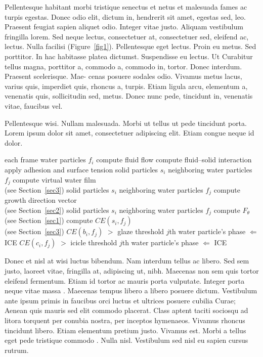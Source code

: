 \documentclass[ASNA,twocolumn]{USG} %
\begin{document}
Pellentesque habitant morbi tristique senectus et netus et malesuada fames ac turpis egestas. Donec odio elit,
dictum in, hendrerit sit amet, egestas sed, leo. Praesent feugiat sapien aliquet odio. Integer vitae justo. Aliquam
vestibulum fringilla lorem. Sed neque lectus, consectetuer at, consectetuer sed, eleifend ac, lectus. Nulla facilisi (Figure~\ref{fig1}).
Pellentesque eget lectus. Proin eu metus. Sed porttitor. In hac habitasse platea dictumst. Suspendisse eu lectus. Ut Curabitur tellus magna, porttitor a, commodo a, commodo in, tortor. Donec interdum. Praesent scelerisque. Mae-
cenas posuere sodales odio. Vivamus metus lacus, varius quis, imperdiet quis, rhoncus a, turpis. Etiam ligula arcu,
elementum a, venenatis quis, sollicitudin sed, metus. Donec nunc pede, tincidunt in, venenatis vitae, faucibus vel.



Pellentesque wisi. \cite{Kucharik2012} Nullam malesuada. Morbi ut tellus ut pede tincidunt porta. Lorem ipsum dolor sit amet,
consectetuer adipiscing elit. Etiam congue neque id dolor.


\begin{algorithm}
\caption{\enskip Pseudocode for our algorithm}\label{alg1}
\begin{algorithmic}
  \For each frame
  \For water particles $f_{i}$
  \State compute fluid flow \cite{Hirt1974}
  \State compute fluid--solid interaction \cite{Benson1992}
  \State apply adhesion and surface tension \cite{Margolin2003}
  \EndFor
   \For solid particles $s_{i}$
   \For neighboring water particles $f_{j}$
   \State compute virtual water film \\(see Section~\ref{sec3})
   \EndFor
   \EndFor
   \For solid particles $s_{i}$
   \For neighboring water particles $f_{j}$
   \State compute growth direction vector \\(see Section~\ref{sec2})
   \EndFor
   \EndFor
   \For solid particles $s_{i}$
   \For neighboring water particles $f_{j}$
   \State compute $F_{\theta}$ (see Section~\ref{sec1})
   \State compute $CE(s_{i},f_{j})$ \\(see Section~\ref{sec3})
   \If $CE(b_{i}, f_{j})$ $>$ glaze threshold
   \State $j$th water particle's phase $\Leftarrow$ ICE
   \EndIf
   \If $CE(c_{i}, f_{j})$ $>$ icicle threshold
   \State $j$th water particle's phase $\Leftarrow$ ICE
   \EndIf
   \EndFor
   \EndFor
  \EndFor
\end{algorithmic}
\end{algorithm}

Donec et nisl at wisi luctus bibendum. Nam interdum tellus ac libero. Sed sem justo, laoreet vitae, fringilla at,
adipiscing ut, nibh. Maecenas non sem quis tortor eleifend fermentum. Etiam id tortor ac mauris porta vulputate.
Integer porta neque vitae massa \cite{Hirt1974,Benson1992}.  Maecenas tempus libero a libero posuere dictum. Vestibulum ante ipsum primis in
faucibus orci luctus et ultrices posuere cubilia Curae; Aenean quis mauris sed elit commodo placerat. Class aptent
taciti sociosqu ad litora torquent per conubia nostra, per inceptos hymenaeos. Vivamus rhoncus tincidunt libero.
Etiam elementum pretium justo. Vivamus est. Morbi a tellus eget pede tristique commodo \cite{Benson1992}. Nulla nisl. Vestibulum
sed nisl eu sapien cursus rutrum.
\end{document}
